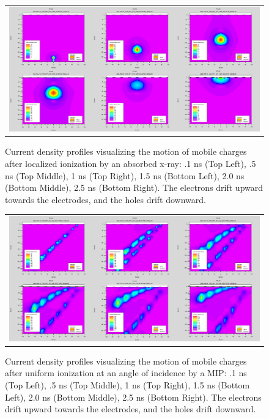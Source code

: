 \begin{figure}[htb]
  \begin{center}
    \begin{tabular}{c}
        \includegraphics[width=.90\textwidth]{fig_FastTiming/CurrentDensity_xray.png}
    \end{tabular}
    \caption{Current density profiles visualizing the motion of mobile charges after localized ionization by an absorbed x-ray:
            .1 \si{\ns} (Top Left), .5 \si{\ns} (Top Middle), 1 \si{\ns} (Top Right), 1.5 \si{\ns} (Bottom Left), 2.0 \si{\ns} (Bottom Middle), 2.5 \si{\ns} (Bottom Right).
            The electrons drift upward towards the electrodes, and the holes drift downward.
            }
    \label{CurrentDensity_xray}
  \end{center}
\end{figure}
\begin{figure}[htb]
  \begin{center}
    \begin{tabular}{c}
        \includegraphics[width=.90\textwidth]{fig_FastTiming/CurrentDensity_MIP.png}
    \end{tabular}
    \caption{Current density profiles visualizing the motion of mobile charges after uniform ionization at an angle of incidence by a MIP:
            .1 \si{\ns} (Top Left), .5 \si{\ns} (Top Middle), 1 \si{\ns} (Top Right), 1.5 \si{\ns} (Bottom Left), 2.0 \si{\ns} (Bottom Middle), 2.5 \si{\ns} (Bottom Right).
            The electrons drift upward towards the electrodes, and the holes drift downward.
            }
    \label{CurrentDensity_MIP}
  \end{center}
\end{figure}

